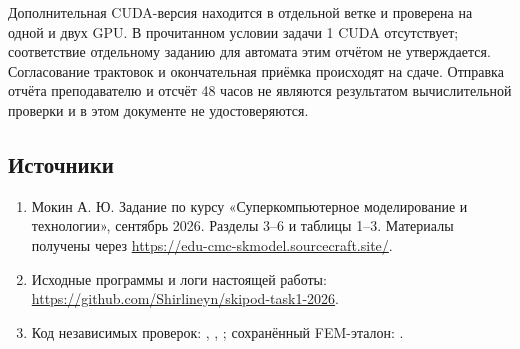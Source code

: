 \documentclass[11pt,a4paper]{article}
\begin{document}
Дополнительная CUDA-версия находится в отдельной ветке и проверена
на одной и двух GPU. В прочитанном условии задачи 1 CUDA отсутствует;
соответствие отдельному заданию для автомата этим отчётом не утверждается.
Согласование трактовок и окончательная приёмка происходят на сдаче.
Отправка отчёта преподавателю и отсчёт 48 часов не являются результатом
вычислительной проверки и в этом документе не удостоверяются.

\subsection*{Источники}
\begin{enumerate}
\item Мокин А. Ю. Задание по курсу «Суперкомпьютерное моделирование
и технологии», сентябрь 2026. Разделы 3--6 и таблицы 1--3.
Материалы получены через \url{https://edu-cmc-skmodel.sourcecraft.site/}.
\item Исходные программы и логи настоящей работы:
\url{https://github.com/Shirlineyn/skipod-task1-2026}.
\item Код независимых проверок: ,
, ;
сохранённый FEM-эталон: .
\end{enumerate}
\endgroup
\end{document}

